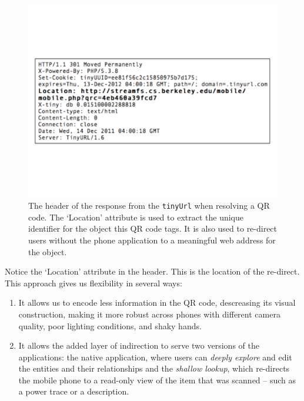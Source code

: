 \begin{figure}[htb!]
\begin{center}
\includegraphics[scale=0.30]{figs/tinyurlhdr}
\caption{The header of the response from the {\tt tinyUrl} when resolving a QR code.  The `Location' attribute
is used to extract the unique identifier for the object this QR code tags.  It is also used to re-direct
users without the phone application to a meaningful web address for the object.}
\label{fig:tinyurlhdr}
\end{center}
\end{figure}


Notice the `Location' attribute in the header.  This is the location of the re-direct.  This approach gives us
flexibility in several ways:

\begin{enumerate}
\item It allows us to encode less information in the QR code, descreasing its visual construction, making it more
		robust across phones with different camera quality, poor lighting conditions, and shaky hands.
\item It allows the added layer of indirection to serve two versions of the applications:  the native application,
		where users can \emph{deeply explore} and edit the entities and their relationships and the \emph{shallow lookup}, 
		which re-directs the mobile phone to a read-only view of the item that was scanned -- such as a power trace or 
		a description.
\end{enumerate}



